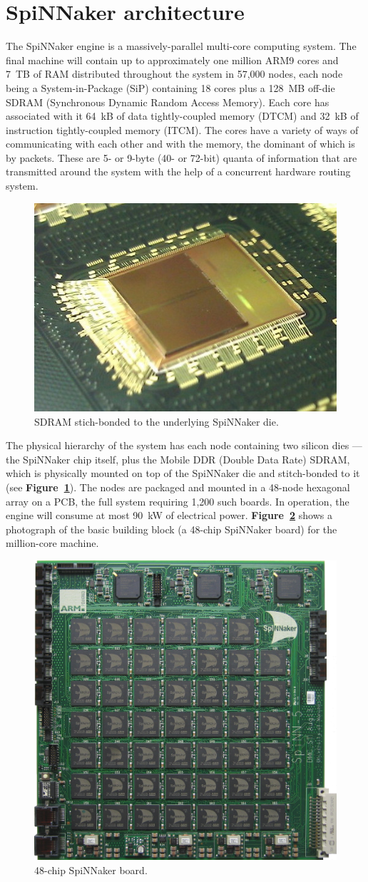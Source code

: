 \documentclass[oneside, a4paper, 11pt]{memoir}
\begin{document}
\section{SpiNNaker architecture}

The SpiNNaker engine is a massively-parallel multi-core computing system. The final machine will contain up to approximately one million ARM9 cores and 7~TB of RAM distributed throughout the system in 57,000 nodes, each node being a System-in-Package (SiP) containing 18 cores plus a 128~MB off-die SDRAM (Synchronous Dynamic Random Access Memory). Each core has associated with it 64~kB of data tightly-coupled memory (DTCM) and 32~kB of instruction tightly-coupled memory (ITCM). The cores have a variety of ways of communicating with each other and with the memory, the dominant of which is by packets. These are 5- or 9-byte (40- or 72-bit) quanta of information that are transmitted around the system with the help of a concurrent hardware routing system. 

\begin{figure}[htbp]
	\centering
	\includegraphics[width=0.25\linewidth]{images/spinnaker_die.jpg}
	\caption{SDRAM stich-bonded to the underlying SpiNNaker die.}
	\label{fig:spinnaker_die}
\end{figure}

The physical hierarchy of the system has each node containing two silicon dies --- the SpiNNaker chip itself, plus the Mobile DDR (Double Data Rate) SDRAM, which is physically mounted on top of the SpiNNaker die and stitch-bonded to it (see \textbf{Figure~\ref{fig:spinnaker_die}}). The nodes are packaged and mounted in a 48-node hexagonal array on a PCB, the full system requiring 1,200 such boards. In operation, the engine will consume at most 90~kW of electrical power. \textbf{Figure~\ref{fig:spin5}} shows a photograph of the basic building block (a 48-chip SpiNNaker board) for the million-core machine.

\begin{figure}[htbp]
	\centering
	\includegraphics[width=0.45\linewidth]{images/spin5.jpg}
	\caption{48-chip SpiNNaker board.}
	\label{fig:spin5}
\end{figure}
\end{document}
